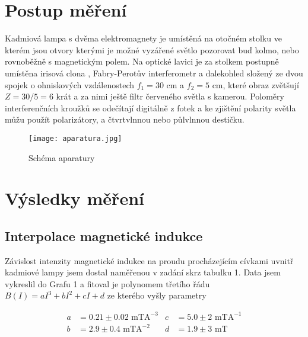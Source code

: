 \documentclass[a4paper,11pt]{article}
\begin{document}
\section{Postup měření}

Kadmiová lampa s dvěma elektromagnety je umístěná na otočném stolku ve kterém jsou otvory kterými je možné vyzářené světlo pozorovat buď kolmo, nebo rovnoběžně s magnetickým polem. Na optické lavici je za stolkem postupně umístěna irisová clona , Fabry-Perotův interferometr a dalekohled složený ze dvou spojek o ohniskových vzdálenostech $ f_1 = 30 $ cm a $ f_2 = 5  $ cm, které obraz zvětšují $ Z = 30  / 5 = 6 $ krát a za nimi ještě filtr červeného světla s kamerou. Poloměry interferenčních kroužků se odečítají digitálně z fotek a ke zjištění polarity světla můžu použít polarizátory, a čtvrtvlnnou nebo půlvlnnou destičku. 

\begin{figure}[htpb]
    \centering
    \texttt{[image: aparatura.jpg]}
    \caption{Schéma aparatury}
\end{figure}

\newpage

\section{Výsledky měření}

\subsection{Interpolace magnetické indukce}

Závislost intenzity magnetické indukce na proudu procházejícím cívkami uvnitř kadmiové lampy jsem dostal naměřenou v zadání skrz tabulku 1. Data jsem vykreslil do Grafu 1 a fitoval je polynomem třetího řádu $ B(I) = aI^3 + bI^2 + cI + d $ ze kterého vyšly parametry

\begin{align*}
    a &= 0.21 \pm 0.02 \text{ mTA}^{-3} &  c &= 5.0 \pm 2 \text{ mTA}^{-1} \\
    b &= 2.9 \pm 0.4 \text{ mTA}^{-2}  &     d &= 1.9 \pm 3 \text{ mT}
\end{align*}

\vspace{-20pt}
\end{document}
